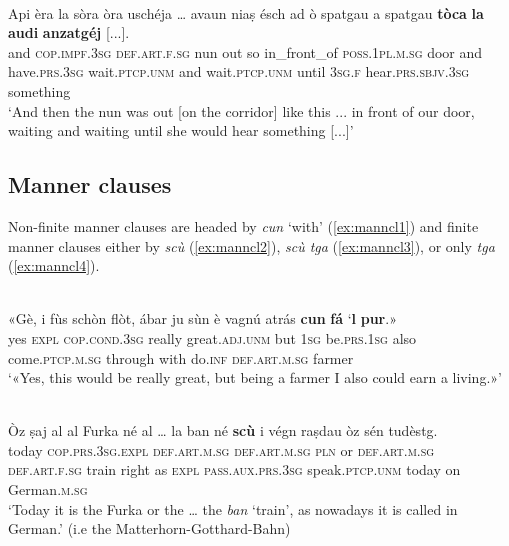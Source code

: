 \ea
\label{ex:tempcl4}
\\
\gll    Api èra la sòra òra uschéja … avaun niaṣ ésch ad ò spatgau a spatgau \textbf{tòca} \textbf{la} \textbf{audi} \textbf{anzatgéj} [...].\\
and \textsc{cop.impf.3sg} \textsc{def.art.f.sg} nun out so {} in\_front\_of \textsc{poss.1pl.m.sg} door and have.\textsc{prs.3sg} wait.\textsc{ptcp.unm} and wait.\textsc{ptcp.unm} until \textsc{3sg.f} hear.\textsc{prs.sbjv.3sg} something\\
\glt `And then the nun was out [on the corridor] like this ... in front of our door, waiting and waiting until she would hear something [...]'
\z


\subsection{Manner clauses}
Non-finite manner clauses are headed by \textit{cun} `with' (\ref{ex:manncl1}) and finite manner clauses either by \textit{scù} (\ref{ex:manncl2}), \textit{scù tga} (\ref{ex:manncl3}), or only \textit{tga} (\ref{ex:manncl4}).

\ea
\label{ex:manncl1}
\\
\gll   «Gè, i fùs schòn flòt, ábar ju sùn è vagnú\footnotemark{} atrás \textbf{cun} \textbf{fá} `\textbf{l} \textbf{pur}.» \\
yes \textsc{expl} \textsc{cop.cond.3sg} really great.\textsc{adj.unm} but \textsc{1sg}  be.\textsc{prs.1sg} also  come.\textsc{ptcp.m.sg} through with  do.\textsc{inf} \textsc{def.art.m.sg} farmer\\
\glt `«Yes, this would be really great, but being a farmer I also could earn a living.»'
\z

\ea
\label{ex:manncl2}
\\
\gll    Òz ṣaj al al Furka né al … la ban\footnotemark{} né \textbf{scù} i végn raṣdau òz sén tudèstg.\\
today \textsc{cop.prs.3sg.expl} \textsc{def.art.m.sg} \textsc{def.art.m.sg} \textsc{pln} or \textsc{def.art.m.sg} {} \textsc{def.art.f.sg} train right as \textsc{expl} \textsc{pass.aux.prs.3sg} speak.\textsc{ptcp.unm} today on German.\textsc{m.sg}\\
\glt `Today it is the Furka or the … the \textit{ban} `train', as nowadays it is called in German.' (i.e the Matterhorn-Gotthard-Bahn)
\z

